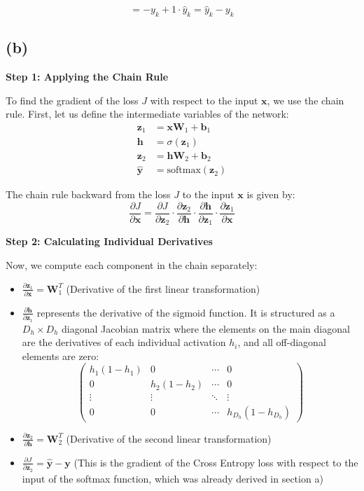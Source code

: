 \documentclass{article}
\begin{document}
$$= -y_k + 1 \cdot \hat{y}_k = \hat{y}_k - y_k$$

\subsection*{(b)}
\textbf{Step 1: Applying the Chain Rule}

To find the gradient of the loss $J$ with respect to the input $\mathbf{x}$, we use the chain rule. First, let us define the intermediate variables of the network:
\begin{align*}
    \mathbf{z}_1 &= \mathbf{x}\mathbf{W}_1 + \mathbf{b}_1 \\
    \mathbf{h} &= \sigma(\mathbf{z}_1) \\
    \mathbf{z}_2 &= \mathbf{h}\mathbf{W}_2 + \mathbf{b}_2 \\
    \hat{\mathbf{y}} &= \text{softmax}(\mathbf{z}_2)
\end{align*}

The chain rule backward from the loss $J$ to the input $\mathbf{x}$ is given by:
$$\frac{\partial J}{\partial \mathbf{x}} = \frac{\partial J}{\partial \mathbf{z}_2} \cdot \frac{\partial \mathbf{z}_2}{\partial \mathbf{h}} \cdot \frac{\partial \mathbf{h}}{\partial \mathbf{z}_1} \cdot \frac{\partial \mathbf{z}_1}{\partial \mathbf{x}}$$

\vspace{1em}
\textbf{Step 2: Calculating Individual Derivatives}

Now, we compute each component in the chain separately:
\begin{itemize}
    \item $\frac{\partial \mathbf{z}_1}{\partial \mathbf{x}} = \mathbf{W}_1^T$ (Derivative of the first linear transformation)
    \item $\frac{\partial \mathbf{h}}{\partial \mathbf{z}_1}$ represents the derivative of the sigmoid function. It is structured as a $D_h \times D_h$ diagonal Jacobian matrix where the elements on the main diagonal are the derivatives of each individual activation $h_i$, and all off-diagonal elements are zero:
    $$ \begin{pmatrix}
    h_1(1-h_1) & 0 & \cdots & 0 \\
    0 & h_2(1-h_2) & \cdots & 0 \\
    \vdots & \vdots & \ddots & \vdots \\
    0 & 0 & \cdots & h_{D_h}(1-h_{D_h})
    \end{pmatrix} $$
    \item $\frac{\partial \mathbf{z}_2}{\partial \mathbf{h}} = \mathbf{W}_2^T$ (Derivative of the second linear transformation)
    \item $\frac{\partial J}{\partial \mathbf{z}_2} = \hat{\mathbf{y}} - \mathbf{y}$ (This is the gradient of the Cross Entropy loss with respect to the input of the softmax function, which was already derived in section a)
\end{itemize}
\end{document}
